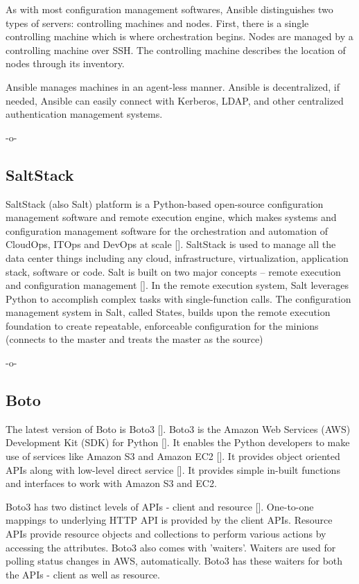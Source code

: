 As with most configuration management softwares, Ansible distinguishes
two types of servers: controlling machines and nodes. First, there is
a single controlling machine which is where orchestration
begins. Nodes are managed by a controlling machine over SSH. The
controlling machine describes the location of nodes through its
inventory.

Ansible manages machines in an agent-less manner. Ansible is
decentralized, if needed, Ansible can easily connect with Kerberos,
LDAP, and other centralized authentication management systems.

     -o-

\subsection{SaltStack}

SaltStack (also Salt) platform is a Python-based open-source
configuration management software and remote execution engine, which
makes systems and configuration management software for the
orchestration and automation of CloudOps, ITOps and DevOps at
scale [\cite{www-saltstack}]. SaltStack is used to manage all the data
center things including any cloud, infrastructure, virtualization,
application stack, software or code. Salt is built on two major
concepts -- remote execution and configuration
management [\cite{SaltStack-book}]. In the remote execution system, Salt
leverages Python to accomplish complex tasks with single-function
calls. The configuration management system in Salt, called States,
builds upon the remote execution foundation to create repeatable,
enforceable configuration for the minions (connects to the master and
treats the master as the source)

     -o-
     
\subsection{Boto}

The latest version of Boto is Boto3 [\cite{www-boto}].  Boto3 is the
Amazon Web Services (AWS) Development Kit (SDK) for
Python [\cite{www-boto-github}]. It enables the Python developers to
make use of services like Amazon S3 and Amazon
EC2 [\cite{www-boto-amazon-python-sdk}].  It provides object oriented
APIs along with low-level direct service
 [\cite{www-boto3-documentation}].  It provides simple in-built
functions and interfaces to work with Amazon S3 and EC2.

Boto3 has two distinct levels of APIs - client and resource
 [\cite{www-boto-amazon-python-sdk}]. One-to-one mappings to underlying
HTTP API is provided by the client APIs. Resource APIs provide
resource objects and collections to perform various actions by
accessing the attributes.  Boto3 also comes with 'waiters'. Waiters
are used for polling status changes in AWS, automatically. Boto3 has
these waiters for both the APIs - client as well as resource.
     
